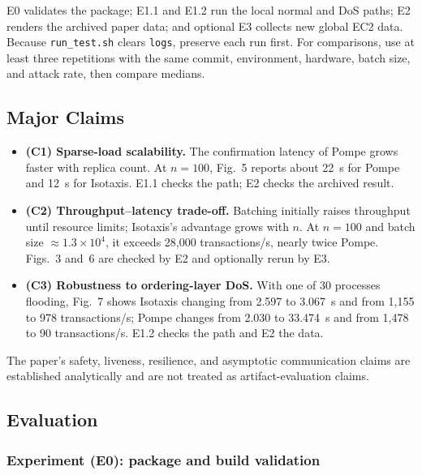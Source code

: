 \documentclass[conference]{IEEEtran}
\begin{document}
E0 validates the package; E1.1 and E1.2 run the local normal and DoS paths; E2
renders the archived paper data; and optional E3 collects new global EC2 data.
Because \texttt{run\_test.sh} clears \texttt{logs}, preserve each run first.
For comparisons, use at least three repetitions with the same commit,
environment, hardware, batch size, and attack rate, then compare medians.

\subsection{Major Claims}

\begin{itemize}
    \setlength{\itemsep}{0pt}
    \setlength{\parskip}{0pt}
    \setlength{\parsep}{0pt}
    \item \textbf{(C1) Sparse-load scalability.}  The confirmation latency of
    Pompe grows faster with replica count.  At $n=100$, Fig.~5 reports about
    22~s for Pompe and 12~s for Isotaxis.  E1.1 checks the path; E2 checks the
    archived result.

    \item \textbf{(C2) Throughput--latency trade-off.}  Batching initially
    raises throughput until resource limits; Isotaxis's advantage grows with
    $n$.  At $n=100$ and batch size $\approx1.3\times10^{4}$, it exceeds
    28,000 transactions/s, nearly twice Pompe.  Figs.~3 and~6 are checked by E2
    and optionally rerun by E3.

    \item \textbf{(C3) Robustness to ordering-layer DoS.}  With one of 30
    processes flooding, Fig.~7 shows Isotaxis changing from 2.597 to 3.067~s
    and from 1,155 to 978 transactions/s; Pompe changes from 2.030 to 33.474~s
    and from 1,478 to 90 transactions/s.  E1.2 checks the path and E2 the data.
\end{itemize}

The paper's safety, liveness, resilience, and asymptotic communication claims
are established analytically and are not treated as artifact-evaluation
claims.

\subsection{Evaluation}

\subsubsection{Experiment (E0): package and build validation}
\end{document}

